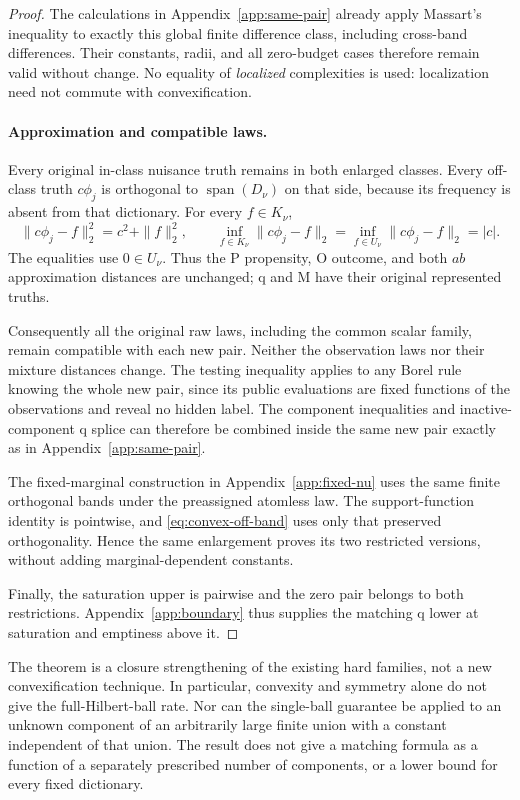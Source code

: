 \begin{proof}
The calculations in Appendix~\ref{app:same-pair} already apply Massart's
inequality to exactly this global finite difference class, including
cross-band differences. Their constants, radii, and all zero-budget
cases therefore remain valid without change. No equality of
\emph{localized} complexities is used: localization need not commute
with convexification.

\paragraph{Approximation and compatible laws.}
Every original in-class nuisance truth remains in both enlarged
classes. Every off-class truth $c\phi_j$ is orthogonal to
$\operatorname{span}(D_\nu)$ on that side, because its frequency is
absent from that dictionary. For every $f\in K_\nu$,
\begin{equation}
 \|c\phi_j-f\|_2^2=c^2+\|f\|_2^2,\qquad
 \inf_{f\in K_\nu}\|c\phi_j-f\|_2
 =\inf_{f\in U_\nu}\|c\phi_j-f\|_2=|c|.
 \label{eq:convex-off-band}
\end{equation}
The equalities use $0\in U_\nu$. Thus the P propensity, O outcome,
and both $ab$ approximation distances are unchanged; q and M have
their original represented truths.

Consequently all the original raw laws, including the common scalar
family, remain compatible with each new pair. Neither the observation
laws nor their mixture distances change. The testing inequality applies
to any Borel rule knowing the whole new pair, since its public
evaluations are fixed functions of the observations and reveal no
hidden label. The component inequalities and inactive-component q
splice can therefore be combined inside the same new pair exactly
as in Appendix~\ref{app:same-pair}.

The fixed-marginal construction in Appendix~\ref{app:fixed-nu} uses the
same finite orthogonal bands under the preassigned atomless law. The
support-function identity is pointwise, and
\eqref{eq:convex-off-band} uses only that preserved orthogonality.
Hence the same enlargement proves its two restricted versions, without
adding marginal-dependent constants.

Finally, the saturation upper is pairwise and the zero pair belongs
to both restrictions. Appendix~\ref{app:boundary} thus supplies the
matching q lower at saturation and emptiness above it.
\end{proof}

The theorem is a closure strengthening of the existing hard families,
not a new convexification technique. In particular, convexity and
symmetry alone do not give the full-Hilbert-ball rate. Nor can the
single-ball guarantee be applied to an unknown component of an
arbitrarily large finite union with a constant independent of that
union. The result does not give a matching formula as a function of
a separately prescribed number of components, or a lower bound for
every fixed dictionary.

